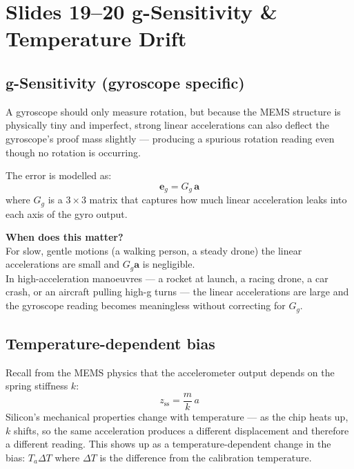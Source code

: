 \documentclass[12pt, a4paper]{article}
\begin{document}
\clearpage
\section*{Slides 19--20 \quad g-Sensitivity \& Temperature Drift}

\subsection*{g-Sensitivity (gyroscope specific)}

A gyroscope should only measure rotation, but because the MEMS structure
is physically tiny and imperfect, strong linear accelerations can also
deflect the gyroscope's proof mass slightly --- producing a spurious
rotation reading even though no rotation is occurring.

The error is modelled as:
\[
  \mathbf{e}_g = G_g\,\mathbf{a}
\]
where $G_g$ is a $3\times3$ matrix that captures how much linear
acceleration leaks into each axis of the gyro output.

\begin{notebox}
  \textbf{When does this matter?}\\
  For slow, gentle motions (a walking person, a steady drone) the
  linear accelerations are small and $G_g\mathbf{a}$ is negligible.\\[4pt]
  In high-acceleration manoeuvres --- a rocket at launch, a racing
  drone, a car crash, or an aircraft pulling high-g turns --- the
  linear accelerations are large and the gyroscope reading becomes
  meaningless without correcting for $G_g$.
\end{notebox}

\subsection*{Temperature-dependent bias}

Recall from the MEMS physics that the accelerometer output depends on
the spring stiffness $k$:
\[
  z_{\text{ss}} = \frac{m}{k}\,a
\]
Silicon's mechanical properties change with temperature --- as the
chip heats up, $k$ shifts, so the same acceleration produces a
different displacement and therefore a different reading.
This shows up as a temperature-dependent change in the bias:
$T_a\Delta T$ where $\Delta T$ is the difference from the calibration
temperature.
\end{document}
